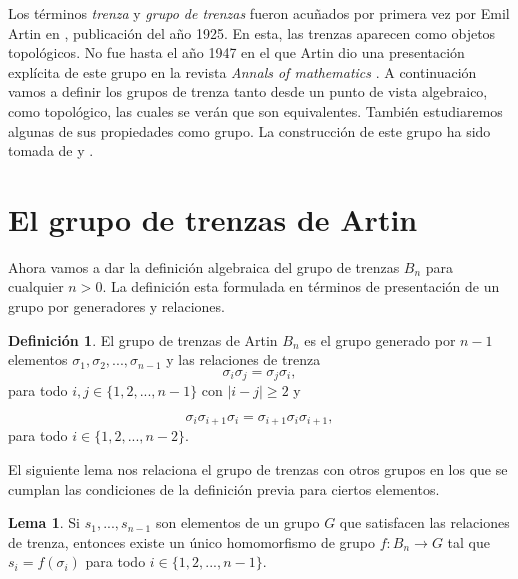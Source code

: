 \documentclass[12pt]{book}
\theoremstyle{definition}
\newtheorem{defi}{Definición}[section]
\newtheorem{lema}{Lema}[section]
\begin{document}
\newpage

Los términos \textit{trenza} y \textit{grupo de trenzas} fueron acuñados por primera vez por Emil Artin en \cite{Art1}, publicación del año 1925. En esta, las trenzas aparecen como objetos topológicos. No fue hasta el año 1947 en el que Artin dio una presentación explícita de este grupo en la revista \textit{Annals of mathematics} \cite{Art2}. A continuación vamos a definir los grupos de trenza tanto desde un punto de vista algebraico, como topológico, las cuales se verán que son equivalentes. También estudiaremos algunas de sus propiedades como grupo. La construcción de este grupo ha sido tomada de  \cite{br_gr} y \cite{st_br}.

\section{El grupo de trenzas de Artin}



Ahora vamos a dar la definición algebraica del grupo de trenzas $B_n$ para cualquier $n>0$. La definición esta formulada en términos de presentación de un grupo por generadores y relaciones.

\begin{defi}
El grupo de trenzas de Artin $B_n$ es el grupo generado por $n-1$ elementos $\sigma_1, \sigma_2,...,\sigma_{n-1}$ y las relaciones de trenza
$$\sigma_i\sigma_j = \sigma_j\sigma_i,$$
para todo $i,j\in\{1,2,...,n-1\}$ con $|i-j|\geq 2$ y

$$\sigma_i\sigma_{i+1}\sigma_i =\sigma_{i+1}\sigma_i\sigma_{i+1},$$
para todo $i\in\{1,2,...,n-2\}$.
\label{defi:artin}
\end{defi}

El siguiente lema nos relaciona el grupo de trenzas con otros grupos en los que se cumplan las condiciones de la definición previa para ciertos elementos.

\begin{lema}
Si $s_1,...,s_{n-1}$ son elementos de un grupo $G$ que satisfacen las relaciones de trenza, entonces existe un único homomorfismo de grupo $f:B_n\rightarrow G$ tal que $s_i = f(\sigma_i)$ para todo $i\in\{1,2,...,n-1\}$.
\label{uni_homo}
\end{lema}
\end{document}
